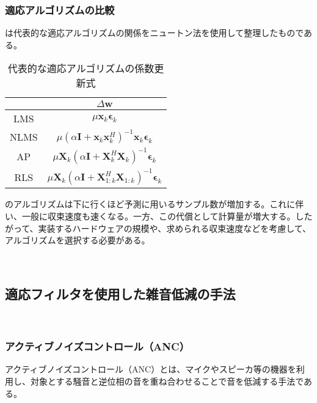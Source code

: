 \subsubsection{適応アルゴリズムの比較}\label{algo-compare}

は代表的な適応アルゴリズムの関係をニュートン法を使用して整理したものである。

\begin{table}[H]
  \centering
  \caption{代表的な適応アルゴリズムの係数更新式}
  \label{tab:formula}
  \begin{tabular}{|c|c|}
  \hline
       & \(\Delta \bm{w}\)                                                                                             \\ \hline
  LMS  & \( \mu \bm{x}_k \bm{\epsilon}_k \)                                                                         \\ \hline
  NLMS & \( \mu \left( \alpha \bm{I} + \bm{x}_k \bm{x}_k^H \right)^{-1} \bm{x}_k \bm{\epsilon}_k \)        \\ \hline
  AP   & \(\mu \bm{X}_k \left( \alpha \bm{I} + \bm{X}_k^H \bm{X}_k \right)^{-1} \bm{\epsilon}_k\)          \\ \hline
  RLS  & \( \mu \bm{X}_k \left( \alpha \bm{I} + \bm{X}_{1:k}^H \bm{X}_{1:k} \right)^{-1} \bm{\epsilon}_k\) \\ \hline
  \end{tabular}
\end{table}

のアルゴリズムは下に行くほど予測に用いるサンプル数が増加する。これに伴い、一般に収束速度も速くなる。一方、この代償として計算量が増大する。したがって、実装するハードウェアの規模や、求められる収束速度などを考慮して、アルゴリズムを選択する必要がある。

\
\subsection{適応フィルタを使用した雑音低減の手法}\label{adf-noise-reduction}

\
\subsubsection{アクティブノイズコントロール（ANC）}\label{anc}

アクティブノイズコントロール（ANC）とは、マイクやスピーカ等の機器を利用し、対象とする騒音と逆位相の音を重ね合わせることで音を低減する手法である。

